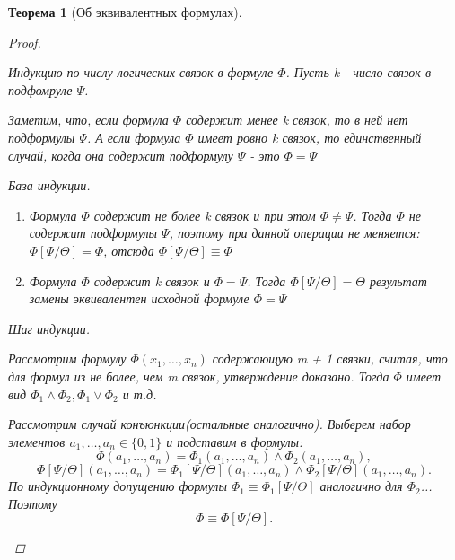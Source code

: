 \documentclass[a4paper]{article}
\newtheorem{theorem}{Теорема}[section]
\theoremstyle{definition}
\theoremstyle{remark}
\begin{document}
\begin{theorem}[Об эквивалентных формулах]
\begin{proof}
\begin{enumerate}
				Индукцию по числу логических связок в формуле $\Phi$. Пусть k - число связок в подфомруле $\Psi$.

				Заметим, что, если формула $\Phi$ содержит менее k связок, то в ней нет подформулы $\Psi$. А если формула $\Phi$ имеет ровно k связок, то единственный случай, когда она содержит подформулу $\Psi$ - это $\Phi = \Psi$

				База индукции. 
				
				\begin{enumerate}
					\item Формула $\Phi$ содержит не более k связок и при этом $\Phi \neq \Psi$. Тогда $\Phi$ не содержит подформулы $\Psi$, поэтому при данной операции не меняется: $\Phi[\Psi/\Theta] = \Phi$, отсюда $\Phi[\Psi/\Theta] \equiv \Phi$
					\item Формула $\Phi$ содержит k связок и $\Phi = \Psi$. Тогда $\Phi[\Psi/\Theta] = \Theta$ результат замены эквивалентен исходной формуле $\Phi = \Psi$
				\end{enumerate}

				Шаг индукции.

				Рассмотрим формулу $\Phi(x_1, \dots , x_n)$ содержающую m + 1 связки, считая, что для формул из не более, чем m связок, утверждение доказано. Тогда $\Phi$  имеет вид $\Phi_1 \wedge \Phi_2, \Phi_1 \vee \Phi_2$ и т.д.

				Рассмотрим случай конъюнкции(остальные аналогично). Выберем набор элементов $a_1, \dots , a_n \in \{0, 1\}$ и подставим в формулы: $$\Phi(a_1, \dots , a_n) = \Phi_1(a_1, \dots , a_n) \wedge \Phi_2(a_1, \dots , a_n),$$
				$$\Phi[\Psi/\Theta](a_1, \dots , a_n) = \Phi_1[\Psi/\Theta](a_1, \dots , a_n) \wedge \Phi_2[\Psi/\Theta](a_1, \dots , a_n).$$
				По индукционному допущению формулы $\Phi_1 \equiv \Phi_1[\Psi/\Theta]$ аналогично для $\Phi_2$... Поэтому $$\Phi \equiv \Phi[\Psi/\Theta].$$
		\end{enumerate}
	\end{proof}
    \end{theorem}
\end{document}
